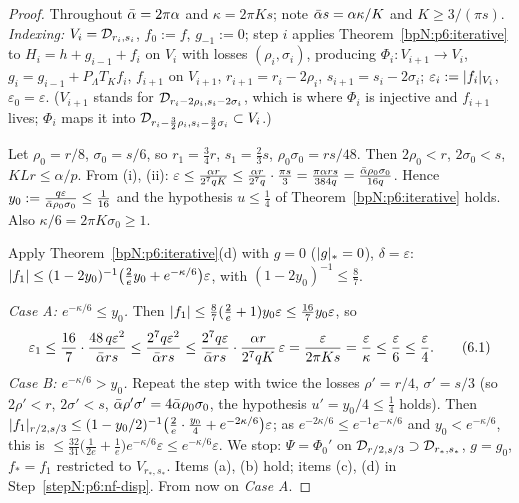 \begin{proof}
Throughout $\bar\alpha=2\pi\alpha$ and $\kappa=2\pi Ks$; note $\bar\alpha s=\alpha\kappa/K$ and $K\ge3/(\pi s)$. \emph{Indexing:} $V_i=\mathcal D_{r_i,s_i}$, $f_0:=f$, $g_{-1}:=0$; step $i$ applies Theorem~\ref{bpN:p6:iterative} to $H_i=h+g_{i-1}+f_i$ on $V_i$ with losses $(\rho_i,\sigma_i)$, producing $\Phi_i:V_{i+1}\to V_i$, $g_i=g_{i-1}+P_\Lambda T_Kf_i$, $f_{i+1}$ on $V_{i+1}$, $r_{i+1}=r_i-2\rho_i$, $s_{i+1}=s_i-2\sigma_i$; $\varepsilon_i:=\lvert f_i\rvert_{V_i}$, $\varepsilon_0=\varepsilon$. ($V_{i+1}$ stands for $\mathcal D_{r_i-2\rho_i,s_i-2\sigma_i}$, which is where $\Phi_i$ is injective and $f_{i+1}$ lives; $\Phi_i$ maps it into $\mathcal D_{r_i-\frac32\rho_i,s_i-\frac32\sigma_i}\subset V_i$.)

\label{stepN:p6:nf-first} Let $\rho_0=r/8$, $\sigma_0=s/6$, so $r_1=\tfrac34r$, $s_1=\tfrac23s$, $\rho_0\sigma_0=rs/48$. Then $2\rho_0<r$, $2\sigma_0<s$, $KLr\le\alpha/p$. From (i), (ii): $\varepsilon\le\frac{\alpha r}{2^7qK}\le\frac{\alpha r}{2^7q}\cdot\frac{\pi s}3=\frac{\pi\alpha rs}{384q}=\frac{\bar\alpha\rho_0\sigma_0}{16q}$. Hence $y_0:=\frac{q\varepsilon}{\bar\alpha\rho_0\sigma_0}\le\frac1{16}$ and the hypothesis $u\le\frac14$ of Theorem~\ref{bpN:p6:iterative} holds. Also $\kappa/6=2\pi K\sigma_0\ge1$.

\label{stepN:p6:nf-case} Apply Theorem~\ref{bpN:p6:iterative}(d) with $g=0$ ($\lvert g\rvert_*=0$), $\delta=\varepsilon$: $\lvert f_1\rvert\le(1-2y_0)^{-1}\bigl(\tfrac2ey_0+e^{-\kappa/6}\bigr)\varepsilon$, with $(1-2y_0)^{-1}\le\frac87$.

\emph{Case A: $e^{-\kappa/6}\le y_0$.} Then $\lvert f_1\rvert\le\frac87(\frac2e+1)y_0\varepsilon\le\frac{16}7y_0\varepsilon$, so
\[\varepsilon_1\le\frac{16}7\cdot\frac{48\,q\varepsilon^2}{\bar\alpha rs}\le\frac{2^7q\varepsilon^2}{\bar\alpha rs}\le\frac{2^7q\varepsilon}{\bar\alpha rs}\cdot\frac{\alpha r}{2^7qK}\,\varepsilon=\frac{\varepsilon}{2\pi Ks}=\frac\varepsilon\kappa\le\frac\varepsilon6\le\frac\varepsilon4 .\tag{6.1}\]
\emph{Case B: $e^{-\kappa/6}>y_0$.} Repeat the step with twice the losses $\rho'=r/4$, $\sigma'=s/3$ (so $2\rho'<r$, $2\sigma'<s$, $\bar\alpha\rho'\sigma'=4\bar\alpha\rho_0\sigma_0$, the hypothesis $u'=y_0/4\le\frac14$ holds). Then $\lvert f_1\rvert_{r/2,s/3}\le(1-y_0/2)^{-1}\bigl(\frac2e\cdot\frac{y_0}4+e^{-2\kappa/6}\bigr)\varepsilon$; as $e^{-2\kappa/6}\le e^{-1}e^{-\kappa/6}$ and $y_0<e^{-\kappa/6}$, this is $\le\frac{32}{31}\bigl(\frac1{2e}+\frac1e\bigr)e^{-\kappa/6}\varepsilon\le e^{-\kappa/6}\varepsilon$. We stop: $\Psi=\Phi_0'$ on $\mathcal D_{r/2,s/3}\supset\mathcal D_{r_*,s_*}$, $g=g_0$, $f_*=f_1$ restricted to $V_{r_*,s_*}$. Items (a), (b) hold; items (c), (d) in Step~\ref{stepN:p6:nf-disp}. From now on \emph{Case A}.


\end{proof}
